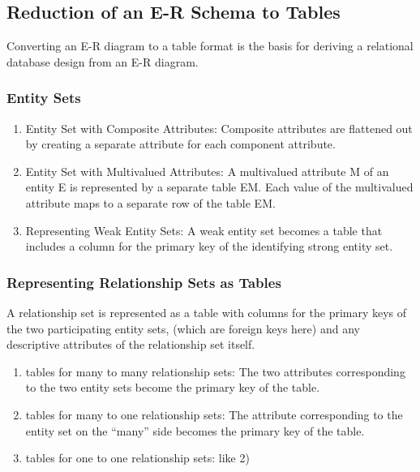 \subsection{Reduction of an E-R Schema to Tables}
Converting an E-R diagram to a table format is the basis for deriving a relational database design from an E-R diagram.

\subsubsection{Entity Sets}
\begin{enumerate}
    \item Entity Set with Composite Attributes: Composite attributes are flattened out by creating a separate attribute for each component attribute.
    \item Entity Set with Multivalued Attributes: A multivalued attribute M of an entity E is represented by a separate table EM. Each value of the multivalued attribute maps to a separate row of the table EM. 
    \item Representing Weak Entity Sets: A weak entity set becomes a table that includes a column for the primary key of the identifying strong entity set.
\end{enumerate}



\subsubsection{Representing Relationship Sets as Tables}
A relationship set is represented as a table with columns for the primary keys of the two participating entity sets, (which are foreign keys here) and any descriptive attributes of the relationship set itself.

\begin{enumerate}\small
    \item tables for many to many relationship sets: The two attributes corresponding to the two entity sets become the primary key of the table.
    \item tables for many to one relationship sets: The attribute corresponding to the entity set on the “many” side becomes the primary key of the table. 
    \item tables for one to one relationship sets: like 2)
\end{enumerate}

